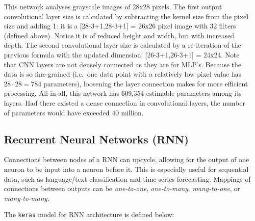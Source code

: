 This network analyses grayscale images of 28x28 pixels. The first output
convolutional layer size is calculated by subtracting the kernel size
from the pixel size and adding 1: it is a [28-3+1,28-3+1] = 
26x26 pixel image with 32 filters (defined above). Notice it is of
reduced height and width, but with increased depth. The second
convolutional layer size is calculated by a re-iteration of the previous
formula with the updated dimension: [26-3+1,26-3+1] =  24x24.
Note that CNN layers are not densely connected as they are for MLP's.
Because the data is so fine-grained (i.e.~one data point with a
relatively low pixel value has \(28 \cdot 28 = 784\) parameters),
loosening the layer connection makes for more efficient processing.
All-in-all, this network has 609,354 estimable parameters among its
layers. Had there existed a dense connection in convolutional layers,
the number of parameters would have exceeded 40 million.

\hypertarget{recurrent-neural-networks-rnn}{%
\subsection{Recurrent Neural Networks
(RNN)}\label{recurrent-neural-networks-rnn}}

Connections between nodes of a RNN can upcycle, allowing for the output of
one neuron to be input into a neuron before it.
\cite{medsker2001recurrent}  This is especially useful for sequential data, such as language/text classification and time series forecasting. Mappings of connections between outputs can be \emph{one-to-one},
\emph{one-to-many}, \emph{many-to-one}, or \emph{many-to-many}.

The \texttt{keras} model for RNN architecture is defined below:

\begin{Shaded}
\begin{Highlighting}[]
\OtherTok{\textless{}{-}} \NormalTok{()}
\SpecialCharTok{\%\textgreater{}\%}
        \NormalTok{(} \NormalTok{, } \NormalTok{) }\SpecialCharTok{\%\textgreater{}\%}
        \NormalTok{(} \NormalTok{) }\SpecialCharTok{\%\textgreater{}\%}
        \NormalTok{(} \NormalTok{, } \NormalTok{)}
\end{Highlighting}
\end{Shaded}

